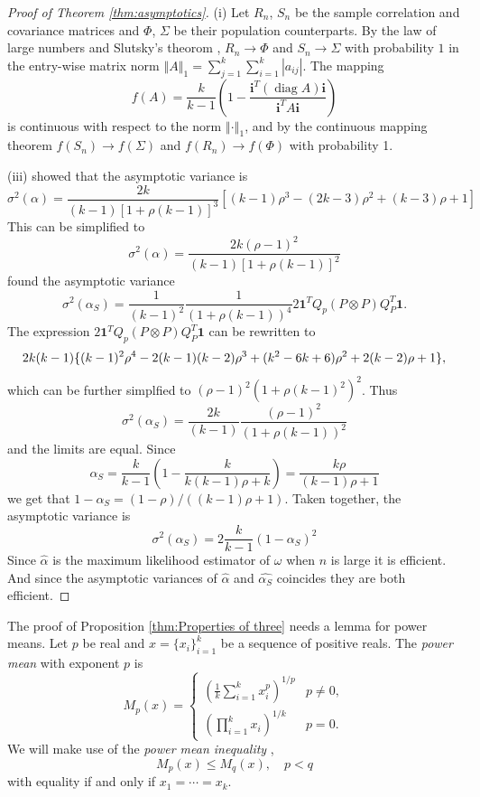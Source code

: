 \documentclass[twoside]{article}
\DeclareMathOperator{\diag}{diag}
\DeclareMathOperator{\tsum}{\textstyle \sum}
\begin{document}
\begin{proof}[Proof of Theorem \ref{thm:asymptotics}]\label{proof:asymptotics}
(i) Let $R_{n}$, $S_{n}$ be the sample correlation and covariance matrices
and $\Phi$, $\Sigma$ be their population counterparts. By the law
of large numbers and Slutsky's theorom \citep[][Lemma 2.8, p. 11]{Van_der_Vaart2000-qc}, $R_{n}\to\Phi$ and $S_{n}\to\Sigma$
with probability $1$ in the entry-wise matrix norm $\left\Vert A\right\Vert _{1}=\tsum_{j=1}^{k}\tsum_{i=1}^{k}\left|a_{ij}\right|$.
The mapping
\[
f(A)=\frac{k}{k-1}\left(1-\frac{\mathbf{i}^{T}(\diag A)\mathbf{i}}{\mathbf{i}^{T}A\mathbf{i}}\right)
\]
is continuous with respect to the norm $\left\Vert \cdot\right\Vert _{1}$,
and by the continuous mapping theorem \citep[][Theorem 2.3, p. 7]{Van_der_Vaart2000-qc}
$f(S_{n})\to f(\Sigma)$ and $f(R_{n})\to f(\Phi)$
with probability 1.

(iii) \citet[eq. 22]{Van_Zyl2000-si} showed that the asymptotic variance
is
\[
\sigma^{2}(\alpha)=\frac{2k}{(k-1)[1+\rho(k-1)]^{3}}[(k-1)\rho^{3}-(2k-3)\rho^{2}+(k-3)\rho+1]
\]
This can be simplified to
\[
\sigma^{2}(\alpha)=\frac{2k(\rho-1)^{2}}{(k-1)[1+\rho(k-1)]^{2}}
\]
\citet[equation 10]{hayashi2005note} found the asymptotic variance
\[
\sigma^{2}(\alpha_S)=\frac{1}{(k-1)^{2}}\frac{1}{(1+\rho(k-1))^{4}}2\mathbf{1}^{T}Q_{p}(P\otimes P)Q_{P}^{T}\mathbf{1}.
\]
The expression $2\mathbf{1}^{T}Q_{p}(P\otimes P)Q_{P}^{T}\mathbf{1}$
can be rewritten to \citep[appendix 3]{hayashi2005note}
\[
2k(k-1)\{ (k-1)^{2}\rho^{4}-2(k-1)(k-2)\rho^{3}+(k^{2}-6k+6)\text{\ensuremath{\rho^{2}+2(k-2)\rho+1}}\} ,
\]
which can be further simplfied to $(\rho-1)^{2}(1+\rho(k-1)^{2})^{2}$.
Thus
\[
\sigma^{2}(\alpha_S)=\frac{2k}{(k-1)}\frac{(\rho-1)^{2}}{(1+\rho(k-1))^{2}}
\]
and the limits are equal.
Since
\begin{equation*}
\alpha_S = \frac{k}{k-1}(1-\frac{k}{k(k-1)\rho+k}) = \frac{k\rho}{(k-1)\rho+1}
\end{equation*}
we get that $1-\alpha_S = (1-\rho)/((k-1)\rho+1)$. Taken together, the asymptotic variance is
\[
\sigma^{2}(\alpha_S)=2\frac{k}{k-1}(1-\alpha_S)^{2}
\]
Since $\hat{\alpha}$ is the maximum likelihood estimator of $\omega$
when $n$ is large it is efficient. And since the asymptotic variances
of $\hat{\alpha}$ and $\hat{\alpha_S}$ coincides they
are both efficient.
\end{proof}

The proof of Proposition \ref{thm:Properties of three} needs a lemma for power means. Let $p$ be real and $x=\{ x_{i}\} _{i=1}^{k}$ be a sequence
of positive reals. The \textit{power mean} with exponent $p$ is
\[
M_{p}(x)=\begin{cases}
(\frac{1}{k}\tsum_{i=1}^{k}x_{i}^{p})^{1/p} & p\neq0,\\
(\prod_{i=1}^{k}x_{i})^{1/k} & p=0.
\end{cases}
\]
We will make use of the \textit{power mean inequality} \citep[][Chapter III]{Bullen2013-os},
\begin{equation}
M_{p}(x)\leq M_{q}(x),\quad p<q\label{eq:generalized mean inequality}
\end{equation}
with equality if and only if $x_{1}=\cdots=x_{k}$. 
\end{document}
